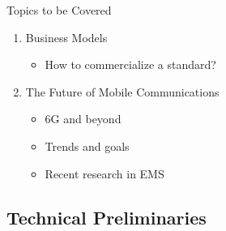 \begin{frame}[allowframebreaks]{Topics to be Covered}
\begin{enumerate}
\begin{itemize}
        \end{itemize}
        \item Business Models
        \begin{itemize}
            \item How to commercialize a standard?
        \end{itemize}
        \item The Future of Mobile Communications
        \begin{itemize}
            \item 6G and beyond
            \item Trends and goals
            \item Recent research in EMS
        \end{itemize}
    \end{enumerate}
\end{frame}

\subsection{Technical Preliminaries}

